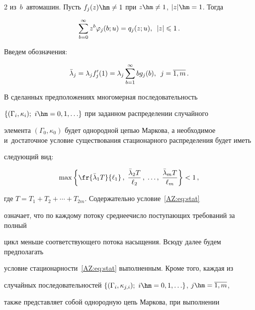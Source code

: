\begin{multicols}{2}
из~$b$~автомашин. Пусть $f_j(z)\hm\neq1$ при $z\hm\neq1$, $|z|\hm=1$. Тогда

\begin{equation*}

\sum\limits_{b=0}^\infty z^b \varphi_j(b; u) = q_j(z;u), \enskip |z|\leqslant1\,.


\end{equation*}



Введем обозначения:

$$

\bar \lambda_j =  \lambda_j f'_j(1)=\lambda_j \sum_{b=1}^\infty b g_j(b), \enskip

j=\overline{1,m}\,.

$$

В сделанных предположениях многомерная последовательность

$\{(\Gamma_i, \kappa_i);\ i\hm=0, 1, \ldots\}$ при заданном распределении случайного

элемента $(\Gamma_0, \kappa_0)$ будет однородной цепью Маркова, а необходимое и~достаточное условие существования стационарного распределения будет иметь

следующий вид:

\begin{equation}

  \max\left\{ \fr{{\bar\lambda_1}T}{\ell_1}\,,\;

  \frac{{\bar\lambda_2}T}{\ell_2}\,,\; \ldots,\;

  \frac{{\bar\lambda_m}T}{\ell_m}\right\}<1\,,

  \label{AZ:eq:stat}

\end{equation}

где $ T=T_1+T_2+\cdots+T_{2m}$. Содержательно условие~\eqref{AZ:eq:stat}

означает, что по каждому потоку среднее\linebreak чис\-ло поступающих требований за полный

цикл меньше соответствующего потока насыщения. Всюду далее будем предполагать

условие стационарности~\eqref{AZ:eq:stat} выполненным. Кроме того, каждая из

случайных последовательностей $\{(\Gamma_i, \kappa_{j,i});\ i\hm= 0,1, \ldots\}$, $j\hm=\overline{1,  m}$, 

также представляет собой однородную цепь Маркова, при выполнении


\end{multicols}
